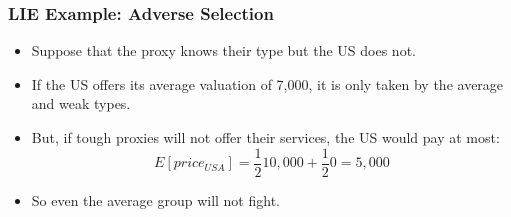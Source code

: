 \documentclass[aspectratio=169, handout]{beamer}
\numberwithin{equation}{section}
\begin{document}
\begin{frame}
\frametitle{LIE Example: Adverse Selection}
\begin{itemize}
\item  Suppose that the proxy knows their type but the US does not.\pause
\item If the US offers its average valuation of 7,000, it is only taken by the average and weak types.\pause
\item But, if tough proxies will not offer their services, the US would pay at most:
$$E[price_{USA}]=\frac{1}{2}10,000+\frac{1}{2}0=5,000$$
\item So even the average group will not fight.
\end{itemize}
\end{frame}

%
%
%
%
%
\end{document}
